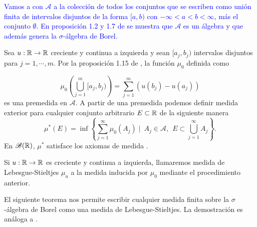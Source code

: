 \textcolor{blue}{Vamos a  con $\mathcal{A}$  a la colección de todos los conjuntos que se escriben como unión finita de intervalos disjuntos de la forma $[a,b)$ con $-\infty<a<b<\infty$, más el conjunto $\emptyset$. En proposición 1.2 y  1.7 de \cite{folland} se muestra que  $\mathcal{A}$ es un álgebra y que además genera la $\sigma$-álgebra de Borel.}



Sea  $u:\mathbb{R} \to \mathbb{R}$  creciente y continua a izquierda y sean  $[a_j,b_j)$ intervalos disjuntos para $j=1, \cdots ,m$. Por la proposición 1.15 de \cite{folland}, la función  $\mu_{0}$ definida como 

$$\mu_{0}\left( \bigcup_{j=1}^m[a_j,b_j)\right)  =\sum_{j=1}^{m}\left(u(b_j)-u(a_j)\right) $$
es una premedida  en $\mathcal{A}$. A partir de una premedida podemos definir  medida exterior para cualquier conjunto arbitrario $E\subset\mathbb{R}$  de la siguiente manera 
$$\mu^{*}(E)=\inf\left\lbrace \sum_{ j=1 }^{\infty}\mu_{0}(A_j) \mid \ A_j\in \mathcal{A}, \ \  E\subset\bigcup_{j=1}^{\infty}A_j \right\rbrace. $$\index[Simbolo]{$\mu^{*}$}En $\mathscr{B}(\mathbb{R})$, $\mu^{*}$ satisface los axiomas de medida \cite[Proposición 1.13]{folland}.
\begin{defi}\label{defi:med_lebe_sti}
	Si $u:\mathbb{R} \to \mathbb{R}$ es creciente y continua a izquierda, llamaremos medida de Lebesgue-Stieltjes $\mu_{u}$ a la medida inducida por $\mu_{0}$ mediante el procedimiento anterior. 
\end{defi}

El siguiente teorema nos permite escribir cualquier medida finita sobre la $\sigma$-álgebra de Borel como una medida de Lebesgue-Stieltjes. La demostración es análoga a  \cite[Teorema  1.16]{folland}.

